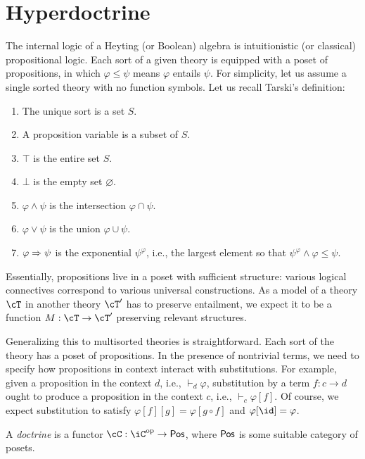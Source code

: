 \documentclass[article,10pt,oneside]{memoir}
\begin{document}
\section{Hyperdoctrine}
\label{sec:hyperdoctrine}

The internal logic of a Heyting (or Boolean) algebra is intuitionistic (or classical) propositional logic.
Each sort of a given theory is equipped with a poset of propositions, in which $\varphi \leq \psi$ means $\varphi$ entails $\psi$.
For simplicity, let us assume a single sorted theory with no function symbols.
Let us recall Tarski's definition:
\begin{enumerate}
\item The unique sort is a set $S$.
\item A proposition variable is a subset of $S$.
\item $\top$ is the entire set $S$.
\item $\bot$ is the empty set $\varnothing$.
\item $\varphi \wedge \psi$ is the intersection $\varphi \cap \psi$.
\item $\varphi \vee \psi$ is the union $\varphi \cup \psi$.
\item $\varphi \Rightarrow \psi$ is the exponential $\psi^{\varphi}$, i.e., the largest element so that $\psi^{\varphi} \wedge \varphi \leq \psi$.
\end{enumerate}

Essentially, propositions live in a poset with sufficient structure: various logical connectives correspond to various universal constructions.
As a model of a theory $\cT$ in another theory $\cT'$ has to preserve entailment, we expect it to be a function $M : \cT \to \cT'$ preserving relevant structures.

Generalizing this to multisorted theories is straightforward.
Each sort of the theory has a poset of propositions.
In the presence of nontrivial terms, we need to specify how propositions in context interact with substitutions.
For example, given a proposition in the context $d$, i.e., $\vdash_{d} \varphi$, substitution by a term $f : c \to d$ ought to produce a proposition in the context $c$, i.e., $\vdash_{c} \varphi[f]$.
Of course, we expect substitution to satisfy $\varphi[f][g] = \varphi[g \circ f]$ and $\varphi[\id] = \varphi$.

\begin{defn}
  A \emph{doctrine} is a functor $\cC : \iC\op \to \CPos$, where $\mathsf{Pos}$ is some suitable category of posets.
\end{defn}
\end{document}
